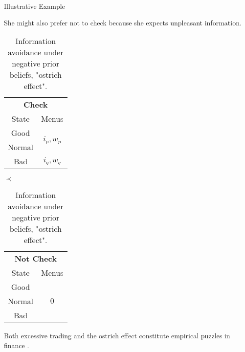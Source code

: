 \documentclass[usenames,dvipsnames,aspectratio=169,11pt, envcountsect, handout]{beamer}
\begin{document}
\begin{frame}[noframenumbering]{Illustrative Example}

	She might also prefer not to check because she expects unpleasant information.

	\vfill

	\begin{table}[H]
		\centering
		\begin{minipage}{0.29\textwidth}

		\end{minipage}\hspace{0.3cm} %
		\begin{minipage}{0.29\textwidth}
			\centering
			\begin{tabular}{c | c}
				\multicolumn{2}{c}{\textbf{Check}}                                     \\
				State                & Menus                                           \\
				\hline
				{\color{blue}Good}   & \multirow{2}{*}{{\color{blue}\( i_{p}, w_p \)}} \\
				{\color{blue}Normal} &                                                 \\
				Bad                  & \(  i_{q}, w_q \)                               \\
			\end{tabular}
			\vspace{0.5cm} %
		\end{minipage}\hspace{0.5cm} %
		\( \prec  \)
		\begin{minipage}{0.29\textwidth}
			\centering
			\begin{tabular}{c | c}
				\multicolumn{2}{c}{\textbf{Not Check}} \\
				State  & Menus                         \\
				\hline
				Good   & \multirow{3}{*}{ \( 0 \)}     \\
				Normal &                               \\
				Bad    &                               \\
			\end{tabular}
			\vspace{0.5cm} %
		\end{minipage}
		\caption{Information avoidance under negative prior beliefs, "ostrich effect".} %
		\label{tab:oistrich}
	\end{table} \pause

	Both excessive trading and the ostrich effect constitute empirical puzzles in finance \citep{danielOverconfidentInvestorsPredictable2015,golmanInformationAvoidance2017}.

\end{frame}
\end{document}
